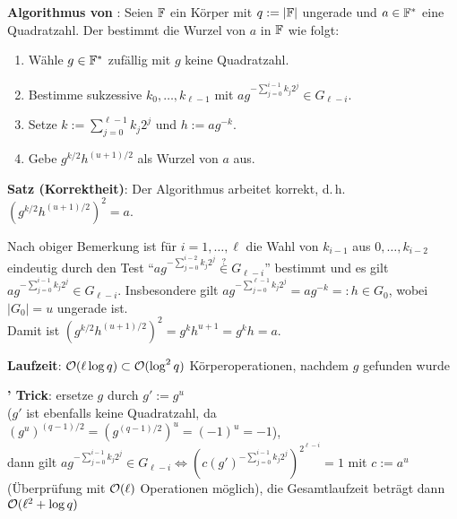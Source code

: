 \textbf{Algorithmus von }:
Seien $\mathbb{F}$ ein Körper mit $q := |\mathbb{F}|$ ungerade und $a \in \mathbb{F}^\ast$ eine Quadratzahl.
Der  bestimmt die Wurzel von $a$ in $\mathbb{F}$ wie folgt:
\begin{enumerate}
    \item
    Wähle $g \in \mathbb{F}^\ast$ zufällig mit $g$ keine Quadratzahl.

    \item
    Bestimme sukzessive $k_0, \dotsc, k_{\ell-1}$ mit
    $ag^{-\sum_{j=0}^{i-1} k_j 2^j} \in G_{\ell-i}$.

    \item
    Setze $k := \sum_{j=0}^{\ell-1} k_j 2^j$ und $h := ag^{-k}$.

    \item
    Gebe $g^{k/2} h^{(u+1)/2}$ als Wurzel von $a$ aus.
\end{enumerate}

\linie

\textbf{Satz (Korrektheit)}:
Der Algorithmus arbeitet korrekt, d.\,h. $(g^{k/2} h^{(u+1)/2})^2 = a$.

\begin{Beweis}
    Nach obiger Bemerkung ist für $i = 1, \dotsc, \ell$ die Wahl von $k_{i-1}$ aus
    $0, \dotsc, k_{i-2}$ eindeutig durch den Test
    "`$ag^{-\sum_{j=0}^{i-2} k_j 2^j} \overset{?}{\in} G_{\ell-i}$"' bestimmt
    und es gilt $ag^{-\sum_{j=0}^{i-1} k_j 2^j} \in G_{\ell-i}$.
    Insbesondere gilt
    $ag^{-\sum_{j=0}^{\ell-1} k_j 2^j} = ag^{-k} =: h \in G_0$,
    wobei $|G_0| = u$ ungerade ist.\\
    Damit ist $(g^{k/2} h^{(u+1)/2})^2 = g^k h^{u+1} = g^k h = a$.
\end{Beweis}

\linie

\textbf{Laufzeit}:
$\mathcal{O}(\ell \log q) \subset \mathcal{O}(\log^2 q)$ Körperoperationen, nachdem $g$ gefunden wurde

\textbf{' Trick}:
ersetze $g$ durch $g' := g^u$\\
($g'$ ist ebenfalls keine Quadratzahl, da
$(g^u)^{(q-1)/2} = (g^{(q-1)/2})^u = (-1)^u = -1$),\\
dann gilt $ag^{-\sum_{j=0}^{i-1} k_j 2^j} \in G_{\ell-i} \iff
(c (g')^{-\sum_{j=0}^{i-1} k_j 2^j})^{2^{\ell-i}} = 1$
mit $c := a^u$ (Überprüfung mit $\mathcal{O}(\ell)$ Operationen möglich),
die Gesamtlaufzeit beträgt dann $\mathcal{O}(\ell^2 + \log q)$

\pagebreak
